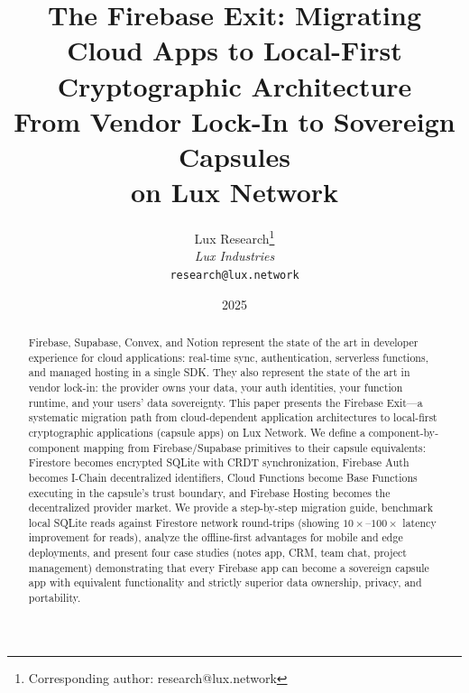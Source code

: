 \documentclass[11pt,a4paper]{article}
\title{\textbf{The Firebase Exit: Migrating Cloud Apps to Local-First Cryptographic Architecture}\\[6pt]
\large From Vendor Lock-In to Sovereign Capsules\\on Lux Network}
\author{
Lux Research\thanks{Corresponding author: research@lux.network}\\
\textit{Lux Industries}\\
\texttt{research@lux.network}
}
\date{2025}
\begin{document}
\luxcoverpage

\begin{abstract}
Firebase, Supabase, Convex, and Notion represent the state of the art in
developer experience for cloud applications: real-time sync, authentication,
serverless functions, and managed hosting in a single SDK. They also
represent the state of the art in vendor lock-in: the provider owns your
data, your auth identities, your function runtime, and your users' data
sovereignty. This paper presents the Firebase Exit---a systematic migration
path from cloud-dependent application architectures to local-first
cryptographic applications (capsule apps) on Lux Network. We define a
component-by-component mapping from Firebase/Supabase primitives to their
capsule equivalents: Firestore becomes encrypted SQLite with CRDT
synchronization, Firebase Auth becomes I-Chain decentralized identifiers,
Cloud Functions become Base Functions executing in the capsule's trust
boundary, and Firebase Hosting becomes the decentralized provider market.
We provide a step-by-step migration guide, benchmark local SQLite reads
against Firestore network round-trips (showing $10\times$--$100\times$
latency improvement for reads), analyze the offline-first advantages for
mobile and edge deployments, and present four case studies (notes app, CRM,
team chat, project management) demonstrating that every Firebase app can
become a sovereign capsule app with equivalent functionality and strictly
superior data ownership, privacy, and portability.
\end{abstract}











\end{document}
